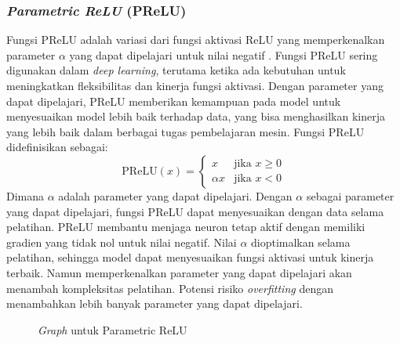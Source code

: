 \subsubsection{\textit{Parametric ReLU} (PReLU)}

Fungsi PReLU adalah variasi dari fungsi aktivasi ReLU yang memperkenalkan parameter $\alpha$ yang dapat dipelajari untuk nilai negatif \cite{GoodBengCour16}. Fungsi PReLU sering digunakan dalam \textit{deep learning}, terutama ketika ada kebutuhan untuk meningkatkan fleksibilitas dan kinerja fungsi aktivasi. Dengan parameter yang dapat dipelajari, PReLU memberikan kemampuan pada model untuk menyesuaikan model lebih baik terhadap data, yang bisa menghasilkan kinerja yang lebih baik dalam berbagai tugas pembelajaran mesin. Fungsi PReLU didefinisikan sebagai:
\begin{equation}
    \text{PReLU}(x) = \begin{cases} 
x & \text{jika } x \geq 0 \\
\alpha x & \text{jika } x < 0 
\end{cases}
\end{equation}
Dimana \(\alpha\) adalah parameter yang dapat dipelajari. Dengan \(\alpha\) sebagai parameter yang dapat dipelajari, fungsi PReLU dapat menyesuaikan dengan data selama pelatihan. PReLU membantu menjaga neuron tetap aktif dengan memiliki gradien yang tidak nol untuk nilai negatif. Nilai \(\alpha\) dioptimalkan selama pelatihan, sehingga model dapat menyesuaikan fungsi aktivasi untuk kinerja terbaik. Namun memperkenalkan parameter yang dapat dipelajari akan menambah kompleksitas pelatihan. Potensi risiko \textit{overfitting} dengan menambahkan lebih banyak parameter yang dapat dipelajari.

\begin{figure}[H]
    \centering
    \caption{\textit{Graph} untuk Parametric ReLU}
    \label{fig:enter-label}
\end{figure}

